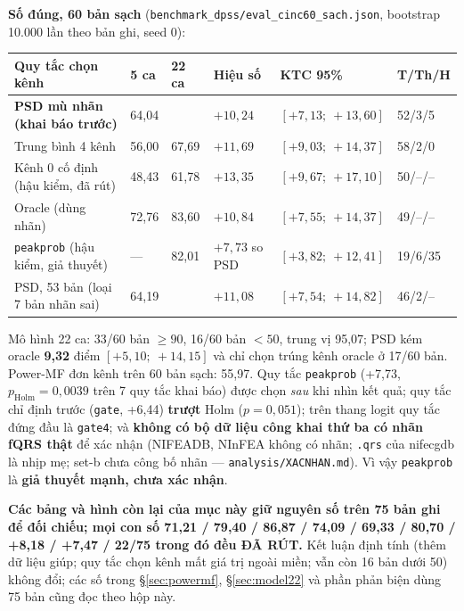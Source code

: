\begin{canhbao}[title={RÚT LẠI (bản 3.5, vòng 7): mọi con số CinC 2013 trên 75 bản ghi trong mục này}]
\textbf{Số đúng, 60 bản sạch} (\texttt{benchmark\_dpss/eval\_cinc60\_sach.json}, bootstrap 10.000 lần theo
bản ghi, seed 0):
\begin{center}\small
\begin{tabular}{@{}L{4.2cm} C{1.5cm} C{1.5cm} C{1.6cm} C{2.6cm} C{1.5cm}@{}}
\toprule
\textbf{Quy tắc chọn kênh} & \textbf{5 ca} & \textbf{22 ca} & \textbf{Hiệu số} & \textbf{KTC 95\%} & \textbf{T/Th/H} \\
\midrule
\textbf{PSD mù nhãn (khai báo trước)} & 64,04 &  & $+10{,}24$ & $[+7{,}13;\ +13{,}60]$ & 52/3/5 \\
Trung bình 4 kênh & 56,00 & 67,69 & $+11{,}69$ & $[+9{,}03;\ +14{,}37]$ & 58/2/0 \\
Kênh 0 cố định (hậu kiểm, đã rút) & 48,43 & 61,78 & $+13{,}35$ & $[+9{,}67;\ +17{,}10]$ & 50/--/-- \\
Oracle (dùng nhãn) & 72,76 & 83,60 & $+10{,}84$ & $[+7{,}55;\ +14{,}37]$ & 49/--/-- \\
\texttt{peakprob} (hậu kiểm, giả thuyết) & --- & 82,01 & $+7{,}73$ so PSD & $[+3{,}82;\ +12{,}41]$ & 19/6/35 \\
\midrule
PSD, 53 bản (loại 7 bản nhãn sai) & 64,19 &  & $+11{,}08$ & $[+7{,}54;\ +14{,}82]$ & 46/2/-- \\
\bottomrule
\end{tabular}
\end{center}
Mô hình 22 ca: 33/60 bản $\geq 90$, 16/60 bản $< 50$, trung vị 95,07; PSD kém oracle \textbf{9,32} điểm
$[+5{,}10;\ +14{,}15]$ và chỉ chọn trúng kênh oracle ở 17/60 bản. Power-MF đơn kênh trên 60 bản sạch: 55,97.
Quy tắc \texttt{peakprob} (+7,73, $p_{\text{Holm}} = 0{,}0039$ trên 7 quy tắc khai báo) được chọn \emph{sau}
khi nhìn kết quả; quy tắc chỉ định trước (\texttt{gate}, +6,44) \textbf{trượt} Holm ($p = 0{,}051$); trên
thang logit quy tắc đứng đầu là \texttt{gate4}; và \textbf{không có bộ dữ liệu công khai thứ ba có nhãn fQRS
thật} để xác nhận (NIFEADB, NInFEA không có nhãn; \texttt{.qrs} của nifecgdb là nhịp mẹ; set-b chưa công bố
nhãn --- \texttt{analysis/XACNHAN.md}). Vì vậy \texttt{peakprob} là \textbf{giả thuyết mạnh, chưa xác nhận}.

\textbf{Các bảng và hình còn lại của mục này giữ nguyên số trên 75 bản ghi để đối chiếu; mọi con số 71,21 /
79,40 / 86,87 / 74,09 / 69,33 / 80,70 / +8,18 / +7,47 / 22/75 trong đó đều ĐÃ RÚT.} Kết luận định tính (thêm
dữ liệu giúp; quy tắc chọn kênh mất giá trị ngoài miền; vẫn còn 16 bản dưới 50) không đổi; các số trong
\S\ref{sec:powermf}, \S\ref{sec:model22} và phần phản biện dùng 75 bản cũng đọc theo hộp này.
\end{canhbao}

